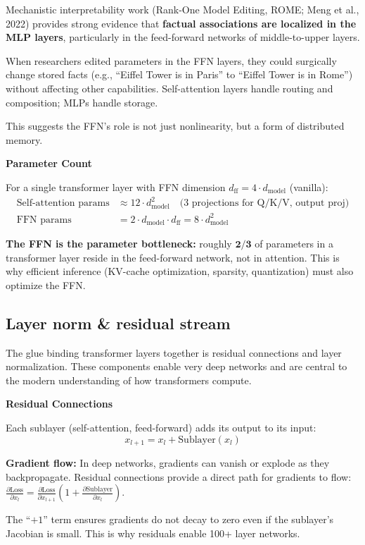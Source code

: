 \begin{paperbox}[title={Where is Factual Knowledge Stored?}]
Mechanistic interpretability work (Rank-One Model Editing, ROME; Meng et al., 2022) provides strong evidence that \textbf{factual associations are localized in the MLP layers}, particularly in the feed-forward networks of middle-to-upper layers.

When researchers edited parameters in the FFN layers, they could surgically change stored facts (e.g., ``Eiffel Tower is in Paris'' to ``Eiffel Tower is in Rome'') without affecting other capabilities. Self-attention layers handle routing and composition; MLPs handle storage.

This suggests the FFN's role is not just nonlinearity, but a form of distributed memory.
\end{paperbox}

\begin{notebox}
\textbf{Parameter Count}

For a single transformer layer with FFN dimension $d_{\text{ff}} = 4 \cdot d_{\text{model}}$ (vanilla):
\begin{align}
  \text{Self-attention params} &\approx 12 \cdot d_{\text{model}}^2 \quad \text{(3 projections for Q/K/V, output proj)} \\
  \text{FFN params} &= 2 \cdot d_{\text{model}} \cdot d_{\text{ff}} = 8 \cdot d_{\text{model}}^2
\end{align}

\textbf{The FFN is the parameter bottleneck:} roughly $\mathbf{2/3}$ of parameters in a transformer layer reside in the feed-forward network, not in attention. This is why efficient inference (KV-cache optimization, sparsity, quantization) must also optimize the FFN.
\end{notebox}

\subsection{Layer norm \& residual stream}

The glue binding transformer layers together is residual connections and layer normalization. These components enable very deep networks and are central to the modern understanding of how transformers compute.

\begin{notebox}
\textbf{Residual Connections}

Each sublayer (self-attention, feed-forward) adds its output to its input:
\[
  x_{l+1} = x_l + \text{Sublayer}(x_l)
\]

\textbf{Gradient flow:} In deep networks, gradients can vanish or explode as they backpropagate. Residual connections provide a direct path for gradients to flow: $\frac{\partial \text{Loss}}{\partial x_l} = \frac{\partial \text{Loss}}{\partial x_{l+1}} \left(1 + \frac{\partial \text{Sublayer}}{\partial x_l}\right)$.

The ``$+1$'' term ensures gradients do not decay to zero even if the sublayer's Jacobian is small. This is why residuals enable 100+ layer networks.
\end{notebox}


